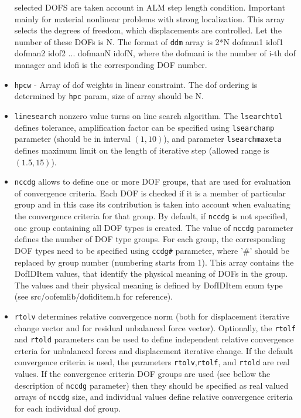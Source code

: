 \documentclass[a4paper]{article}
\newcommand{\param}[1]{\texttt{#1}} %
\begin{document}
\begin{itemize}
selected DOFS are taken account in ALM step length
condition. Important mainly for material nonlinear problems with
strong localization. This array selects the degrees of freedom,
which displacements are controlled. Let the number of these DOFs is N.
The format of \param{ddm} array is 2*N dofman1 idof1
dofman2 idof2 ... dofmanN idofN, where the dofmani is the number of i-th dof manager  and idofi is the
corresponding DOF number.
\item \param{hpcw} - Array of dof weights in linear constraint. The
dof ordering is determined by \param{hpc} param, size of array should
be N.
\item \param{linesearch} nonzero value turns on line search
  algorithm. The \param{lsearchtol} defines tolerance, amplification
  factor can be specified using \param{lsearchamp} parameter (should
  be in interval $(1,10)$), and parameter \param{lsearchmaxeta}
  defines maximum limit on the length of iterative step (allowed range
  is $(1.5,15)$).
\item \param{nccdg} allows to define one or more DOF groups, that are used for evaluation of convergence criteria. Each DOF is checked if it is a member of particular group and in this case its contribution is taken into account when evaluating the convergence criteria for that group. By default, if \param{nccdg} is not specified, one group containing all DOF types is created. The value of \param{nccdg} parameter defines the number of DOF type groups. For each group, the corresponding DOF types need to be specified using \param{ccdg\#} parameter, where '\#' should be replaced by group number (numbering starts from 1). This array contains the DofIDItem values, that identify the physical meaning of DOFs in the group. The values and their physical meaning is defined by DofIDItem enum type (see src/oofemlib/dofiditem.h for reference).
\item \param{rtolv} determines relative convergence norm (both for displacement
iterative change vector and for residual unbalanced force vector). Optionally, the \param{rtolf} and \param{rtold} parameters can be used to define
independent relative convergence crteria for unbalanced forces and displacement
iterative change. If the default convergence criteria is used,
the parameters \param{rtolv},\param{rtolf}, and \param{rtold} are real values. If the convergence criteria DOF groups are used (see bellow the description of \param{nccdg} parameter) then they should be specified as real valued arrays of \param{nccdg} size, and individual values define relative convergence criteria for each individual dof group.
\end{itemize}
\end{document}
